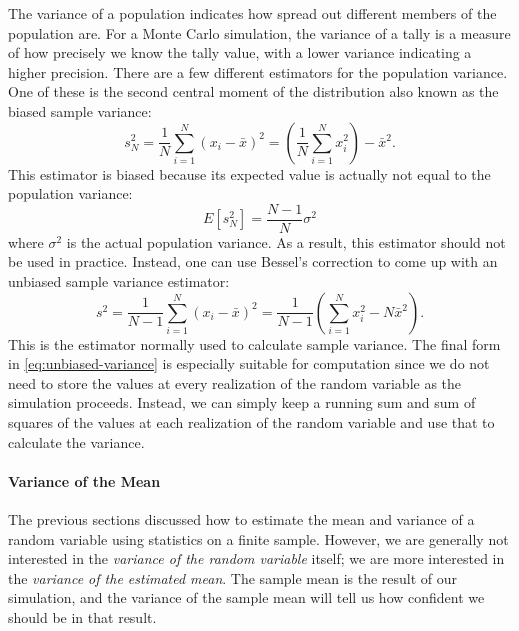 The variance of a population indicates how spread out different members of the
population are. For a Monte Carlo simulation, the variance of a tally is a
measure of how precisely we know the tally value, with a lower variance
indicating a higher precision. There are a few different estimators for the
population variance. One of these is the second central moment of the
distribution also known as the biased sample variance:
\begin{equation}
  \label{eq:biased-variance}
  s_N^2 = \frac{1}{N} \sum_{i=1}^N \left ( x_i - \bar{x} \right )^2 = \left (
  \frac{1}{N} \sum_{i=1}^N x_i^2 \right ) - \bar{x}^2.
\end{equation}
This estimator is biased because its expected value is actually not equal to the
population variance:
\begin{equation}
  \label{eq:biased-variance-expectation}
  E[s_N^2] = \frac{N - 1}{N} \sigma^2
\end{equation}
where $\sigma^2$ is the actual population variance. As a result, this estimator
should not be used in practice. Instead, one can use Bessel's correction to come
up with an unbiased sample variance estimator:
\begin{equation}
  \label{eq:unbiased-variance}
  s^2 = \frac{1}{N - 1} \sum_{i=1}^N \left ( x_i - \bar{x} \right )^2 =
  \frac{1}{N - 1} \left ( \sum_{i=1}^N x_i^2 - N\bar{x}^2 \right ).
\end{equation}
This is the estimator normally used to calculate sample variance. The final form
in \eqref{eq:unbiased-variance} is especially suitable for computation since we
do not need to store the values at every realization of the random variable as
the simulation proceeds. Instead, we can simply keep a running sum and sum of
squares of the values at each realization of the random variable and use that to
calculate the variance.

\paragraph{Variance of the Mean}

The previous sections discussed how to estimate the mean and variance of a
random variable using statistics on a finite sample. However, we are generally
not interested in the \emph{variance of the random variable} itself; we are more
interested in the \emph{variance of the estimated mean}. The sample mean is the
result of our simulation, and the variance of the sample mean will tell us how
confident we should be in that result.

